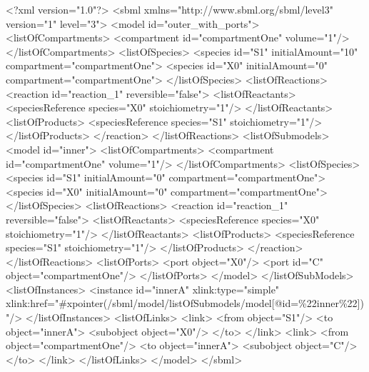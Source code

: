\documentclass{cekarticle}
\begin{document}
\begin{example}
<?xml version="1.0"?>
<sbml xmlns="http://www.sbml.org/sbml/level3" version="1" level="3">
    <model id="outer_with_ports">
        <listOfCompartments>
            <compartment id="compartmentOne" volume="1"/>
        </listOfCompartments>
        <listOfSpecies>
            <species id="S1" initialAmount="10" compartment="compartmentOne">
            <species id="X0" initialAmount="0" compartment="compartmentOne">
        </listOfSpecies>
        <listOfReactions>
            <reaction id="reaction_1" reversible="false">
                <listOfReactants>
                    <speciesReference species="X0" stoichiometry="1"/>
                </listOfReactants>
                <listOfProducts>
                    <speciesReference species="S1" stoichiometry="1"/>
                </listOfProducts>
            </reaction>
        </listOfReactions>
        <listOfSubmodels>
            <model id="inner">
                <listOfCompartments>
                    <compartment id="compartmentOne" volume="1"/>
                </listOfCompartments>
                <listOfSpecies>
                    <species id="S1" initialAmount="0" compartment="compartmentOne">
                    <species id="X0" initialAmount="0" compartment="compartmentOne">
                </listOfSpecies>
                <listOfReactions>
                    <reaction id="reaction_1" reversible="false">
                        <listOfReactants>
                            <speciesReference species="X0" stoichiometry="1"/>
                        </listOfReactants>
                        <listOfProducts>
                            <speciesReference species="S1" stoichiometry="1"/>
                        </listOfProducts>
                    </reaction>
                </listOfReactions>
                <listOfPorts>
                    <port object="X0"/>
                    <port id="C" object="compartmentOne"/>
                </listOfPorts>
            </model>
        </listOfSubModels>
        <listOfInstances>
            <instance
                id="innerA" 
                xlink:type="simple"
                xlink:href="#xpointer(/sbml/model/listOfSubmodels/model[@id=\%22inner\%22])"/>
        </listOfInstances>
        <listOfLinks>
            <link>
                <from object="S1"/>
                <to object="innerA">
                    <subobject object="X0"/>
                </to>
            </link>
            <link>
                <from object="compartmentOne"/>
                <to object="innerA">
                    <subobject object="C"/>
                </to>
            </link>
        </listOfLinks>
    </model>
</sbml>
\end{example}
\end{document}

